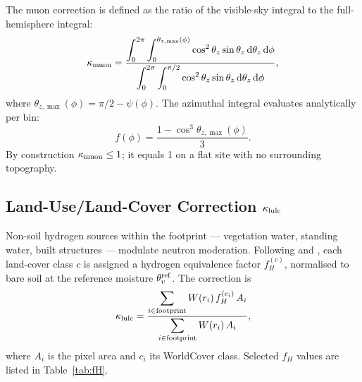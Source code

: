 The muon correction is defined as the ratio of the visible-sky
integral to the full-hemisphere integral:
\begin{equation}
  \kappa_\mathrm{muon} = \frac{\displaystyle\int_0^{2\pi}
              \int_0^{\theta_{z,\max}(\phi)}
              \cos^2\theta_z \sin\theta_z\,\mathrm{d}\theta_z\,\mathrm{d}\phi}
             {\displaystyle\int_0^{2\pi}
              \int_0^{\pi/2}
              \cos^2\theta_z \sin\theta_z\,\mathrm{d}\theta_z\,\mathrm{d}\phi},
  \label{eq:kappa_muon}
\end{equation}
where $\theta_{z,\max}(\phi) = \pi/2 - \psi(\phi)$.
The azimuthal integral evaluates analytically per bin:
\begin{equation}
  f(\phi) = \frac{1 - \cos^3\theta_{z,\max}(\phi)}{3}.
  \label{eq:kappa_muon_az}
\end{equation}
By construction $\kappa_\mathrm{muon} \leq 1$; it equals 1 on a flat site with no
surrounding topography.

\subsection{Land-Use/Land-Cover Correction \texorpdfstring{$\kappa_\mathrm{lulc}$}{kappa\_lulc}}
\label{sec:kappa_lulc}

Non-soil hydrogen sources within the footprint — vegetation water,
standing water, built structures — modulate neutron moderation.
Following \citet{schron2017} and \citet{iwema2017}, each land-cover
class $c$ is assigned a hydrogen equivalence factor $f_H^{(c)}$,
normalised to bare soil at the reference moisture $\theta_v^\mathrm{ref}$.
The correction is
\begin{equation}
  \kappa_\mathrm{lulc} = \frac{\displaystyle\sum_{i\in\mathrm{footprint}}
              W(r_i)\,f_H^{(c_i)}\,A_i}
             {\displaystyle\sum_{i\in\mathrm{footprint}}
              W(r_i)\,A_i},
  \label{eq:kappa_lulc}
\end{equation}
where $A_i$ is the pixel area and $c_i$ its WorldCover class.
Selected $f_H$ values are listed in Table~\ref{tab:fH}.

